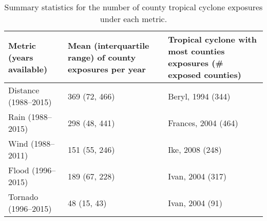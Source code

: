 \begin{table}[ht]
\centering
\caption{Summary statistics for the number of county tropical cyclone exposures under each metric.} 
\label{tab:exposuresummaries}
\begin{tabular}{p{4.5cm}p{4.5cm}p{4.5cm}}
  \toprule
Metric (years available) & Mean (interquartile range) of county exposures per year & Tropical cyclone with most counties exposures (\# exposed counties) \\ 
  \midrule
Distance (1988--2015) & 369 (72, 466) & Beryl, 1994 (344) \\ 
  Rain (1988--2015) & 298 (48, 441) & Frances, 2004 (464) \\ 
  Wind (1988--2011) & 151 (55, 246) & Ike, 2008 (248) \\ 
  Flood (1996--2015) & 189 (67, 228) & Ivan, 2004 (317) \\ 
  Tornado (1996--2015) & 48 (15, 43) & Ivan, 2004 (91) \\ 
   \bottomrule
\end{tabular}
\end{table}
